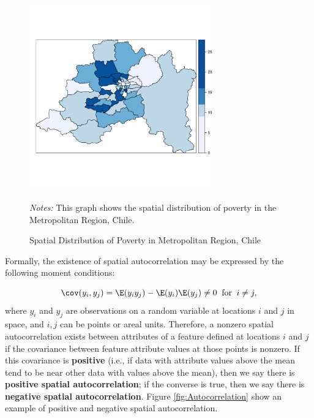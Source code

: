 \begin{figure}[ht]
  \caption{Spatial Distribution of Poverty in Metropolitan Region, Chile}
    \label{fig:MR}
    \centering
    	\begin{minipage}{.9\linewidth}
\begin{knitrout}
\color{fgcolor}

{\centering \includegraphics[width=8cm,height=8cm]{figure/MetroRegion-1} 

}


\end{knitrout}
\footnotesize
		\emph{Notes:} This graph shows the spatial distribution of poverty in the Metropolitan Region, Chile. 
	\end{minipage}	
\end{figure}

Formally, the existence of spatial autocorrelation may be expressed by the following moment conditions:

\begin{equation*}
  \cov(y_i, y_j) = \E(y_iy_j) - \E(y_i)\E(y_j)\neq 0\;\;\mbox{for}\;\; i \neq j,
\end{equation*}
%
where $y_i$ and $y_j$ are observations on a random variable at locations $i$ and $j$ in space, and $i,j$ can be points or areal units. Therefore, a nonzero spatial autocorrelation exists between attributes of a feature defined at locations $i$ and $j$ if the covariance between feature attribute values at those points is nonzero. If this covariance is \textbf{positive} (i.e., if data with attribute values above the mean tend to be near other data with values above the mean), then we say there is \textbf{positive spatial autocorrelation}; if the converse is true, then we say there is \textbf{negative spatial autocorrelation}. Figure \ref{fig:Autocorrelation} show an example of positive and negative spatial autocorrelation. 

